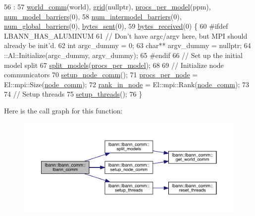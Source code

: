 \begin{DoxyCode}
56                                                      :
57   \hyperlink{classlbann_1_1lbann__comm_a1fc59c935580eab2ce8e60464a45ef39}{world\_comm}(world), \hyperlink{classlbann_1_1lbann__comm_a29fb31be115db3225b145f250a7778d9}{grid}(\textcolor{keyword}{nullptr}), \hyperlink{classlbann_1_1lbann__comm_a7cb55d127259d7ed9f07ccde6f4ebd8c}{procs\_per\_model}(ppm), 
      \hyperlink{classlbann_1_1lbann__comm_aa4f15459eca2a06174a877ba0c23feb7}{num\_model\_barriers}(0),
58   \hyperlink{classlbann_1_1lbann__comm_a03d946ef5ea5d3b15351e78a2eed10fe}{num\_intermodel\_barriers}(0), \hyperlink{classlbann_1_1lbann__comm_a4f01e2f2d8220dc34cf39eb4a255cd7d}{num\_global\_barriers}(0), 
      \hyperlink{classlbann_1_1lbann__comm_ad1f146ae7337ece6266fd307944928e0}{bytes\_sent}(0),
59   \hyperlink{classlbann_1_1lbann__comm_afb99f57f7eafc0695bf28e6c26a8120f}{bytes\_received}(0) \{
60 \textcolor{preprocessor}{#ifdef LBANN\_HAS\_ALUMINUM}
61   \textcolor{comment}{// Don't have argc/argv here, but MPI should already be init'd.}
62   \textcolor{keywordtype}{int} argc\_dummy = 0;
63   \textcolor{keywordtype}{char}** argv\_dummy = \textcolor{keyword}{nullptr};
64   ::Al::Initialize(argc\_dummy, argv\_dummy);
65 \textcolor{preprocessor}{#endif}
66   \textcolor{comment}{// Set up the initial model split}
67   \hyperlink{classlbann_1_1lbann__comm_a0ae02c4083623d2e1381336a73fdb379}{split\_models}(\hyperlink{classlbann_1_1lbann__comm_a7cb55d127259d7ed9f07ccde6f4ebd8c}{procs\_per\_model});
68 
69   \textcolor{comment}{// Initialize node communicators}
70   \hyperlink{classlbann_1_1lbann__comm_a44bc6b8683f04c2a3fc2f01fc734a946}{setup\_node\_comm}();
71   \hyperlink{classlbann_1_1lbann__comm_a2ffc59f0c1d97df2ca6845312c8c8b3e}{procs\_per\_node} = El::mpi::Size(\hyperlink{classlbann_1_1lbann__comm_a8aeb530ae4cedfa4d1141bb9c4704e6c}{node\_comm});
72   \hyperlink{classlbann_1_1lbann__comm_abb5c8b008b5cac11702bf1f991c78ab0}{rank\_in\_node} = El::mpi::Rank(\hyperlink{classlbann_1_1lbann__comm_a8aeb530ae4cedfa4d1141bb9c4704e6c}{node\_comm});
73 
74   \textcolor{comment}{// Setup threads}
75   \hyperlink{classlbann_1_1lbann__comm_a597189b10f61947580f97fb8d1da7355}{setup\_threads}();  
76 \}
\end{DoxyCode}
Here is the call graph for this function\+:\nopagebreak
\begin{figure}[H]
\begin{center}
\leavevmode
\includegraphics[width=350pt]{classlbann_1_1lbann__comm_a63eae73674cbadea2eff8b6595322336_cgraph}
\end{center}
\end{figure}

